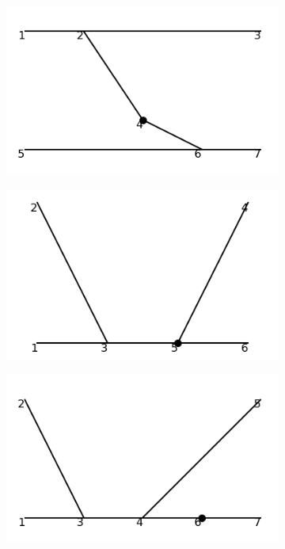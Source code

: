 \documentclass[11pt,a4paper,twoside,pdf]{article}
\numberwithin{equation}{section}
\begin{document}
\begin{figure}[h!]
\begin{subfigure}[t]{0.16\textwidth}
    \end{subfigure}
    \hfill
    \begin{subfigure}[t]{0.16\textwidth}
        \centering
        \includegraphics[width=\textwidth]{plots/order4_2to2/counterterms/7.png}
    \end{subfigure}
    \hfill
    \begin{subfigure}[t]{0.16\textwidth}
        \centering
        \includegraphics[width=\textwidth]{plots/order4_2to2/counterterms/8.png}
    \end{subfigure}
    \hfill 
    \begin{subfigure}[t]{0.16\textwidth}
        \centering
        \includegraphics[width=\textwidth]{plots/order4_2to2/counterterms/9.png}

\end{subfigure}
\end{figure}
\end{document}
